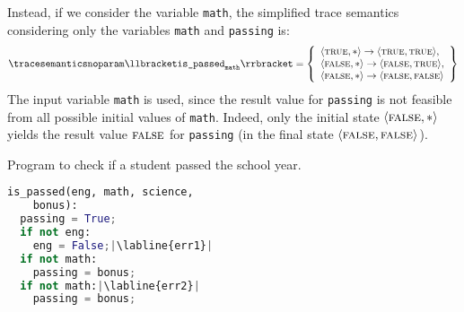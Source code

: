 \begin{example}
Instead, if we consider the variable \texttt{math}, the simplified trace semantics considering only the variables \texttt{math} and \texttt{passing} is:
\begin{align*}
  \tracesemanticsnoparam\semanticsof{\texttt{is\_passed}_\texttt{math}}
  =
  \left\{
    \begin{array}{l}
    \tuple\true\anyvalue\rightarrow\tuple\true\true, \\
    \tuple\false\anyvalue\rightarrow\tuple\false\true, \\
    \tuple\false\anyvalue\rightarrow\tuple\false\false
  \end{array}
  \right\}
\end{align*}
The input variable \texttt{math} is used, since the result value for \texttt{passing} is not feasible from all possible initial values of \texttt{math}.
Indeed, only the initial state $\langle \textsc{false}, {*} \rangle$ yields the result value $\textsc{false}$ for \texttt{passing} (in the final state $\langle \textsc{false}, \textsc{false} \rangle$).
\end{example}
\begin{marginlisting}[*-30]
  \caption{Program to check if a student passed the school year.}
  \vspace{2\lineheight}
\begin{lstlisting}[language=Python,escapechar=|]
is_passed(eng, math, science,
    bonus):
  passing = True;
  if not eng:
    eng = False;|\labline{err1}|
  if not math:
    passing = bonus;
  if not math:|\labline{err2}|
    passing = bonus;
\end{lstlisting}
\end{marginlisting}

